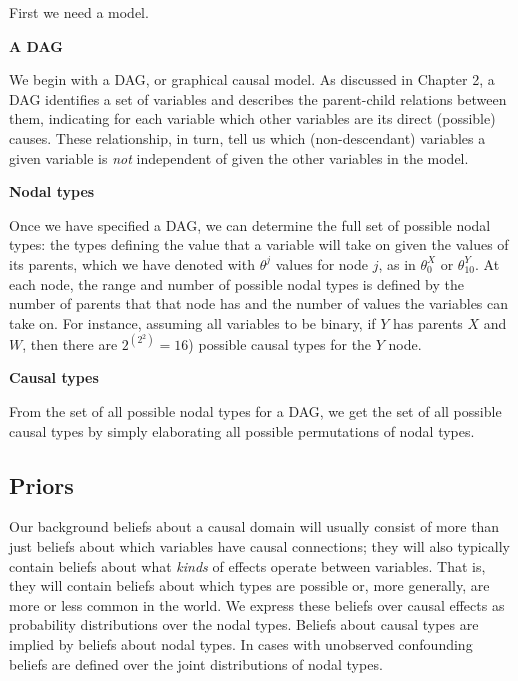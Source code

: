 \documentclass[
  12pt,
]{book}
\begin{document}
First we need a model.

\textbf{A DAG}

We begin with a DAG, or graphical causal model. As discussed in Chapter 2, a DAG identifies a set of variables and describes the parent-child relations between them, indicating for each variable which other variables are its direct (possible) causes. These relationship, in turn, tell us which (non-descendant) variables a given variable is \emph{not} independent of given the other variables in the model.

\textbf{Nodal types}

Once we have specified a DAG, we can determine the full set of possible nodal types: the types defining the value that a variable will take on given the values of its parents, which we have denoted with \(\theta^j\) values for node \(j\), as in \(\theta^X_{0}\) or \(\theta^Y_{10}\). At each node, the range and number of possible nodal types is defined by the number of parents that that node has and the number of values the variables can take on. For instance, assuming all variables to be binary, if \(Y\) has parents \(X\) and \(W\), then there are \(2^{\left(2^2\right)}=16\)) possible causal types for the \(Y\) node.

\textbf{Causal types}

From the set of all possible nodal types for a DAG, we get the set of all possible causal types by simply elaborating all possible permutations of nodal types.

\hypertarget{priors}{%
\subsection{Priors}\label{priors}}

Our background beliefs about a causal domain will usually consist of more than just beliefs about which variables have causal connections; they will also typically contain beliefs about what \emph{kinds} of effects operate between variables. That is, they will contain beliefs about which types are possible or, more generally, are more or less common in the world. We express these beliefs over causal effects as probability distributions over the nodal types. Beliefs about causal types are implied by beliefs about nodal types. In cases with unobserved confounding beliefs are defined over the joint distributions of nodal types.
\end{document}
